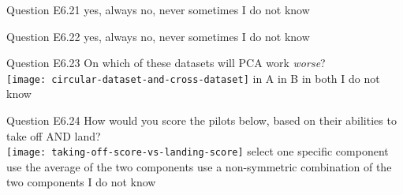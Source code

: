 \begin{frame}{Question E6.21}
	\QuestionAnswers
	{
		\answer yes, always
		\answer no, never
		\correctanswer sometimes
		\answer I do not know
	}
	\QuestionSolution{}
\end{frame}


\begin{frame}{Question E6.22}
	\QuestionAnswers
	{
		\answer yes, always
		\correctanswer no, never
		\answer sometimes
		\answer I do not know
	}
	\QuestionSolution{}
\end{frame}


\begin{frame}{Question E6.23}
	\QuestionBody
	{
	    On which of these datasets will PCA work \emph{worse}? \vspace{0.2cm} \\
	    \centering
	    \texttt{[image: circular-dataset-and-cross-dataset]}
	    \vspace{-1cm}
	}
	\QuestionAnswers
	{
		\answer in A
		\answer in B
		\correctanswer in both
		\answer I do not know
	}
	\QuestionSolution{}
\end{frame}


\begin{frame}{Question E6.24}
	\QuestionBody
	{
		How would you score the pilots below, based on their abilities to take off AND land? \vspace{0.1cm} \\
		\centering
		\texttt{[image: taking-off-score-vs-landing-score]}
	}
	\QuestionAnswers
	{
		\answer select one specific component
		\answer use the average of the two components
		\correctanswer use a non-symmetric combination of the two components
		\answer I do not know
	}
	\QuestionSolution{}
\end{frame}


